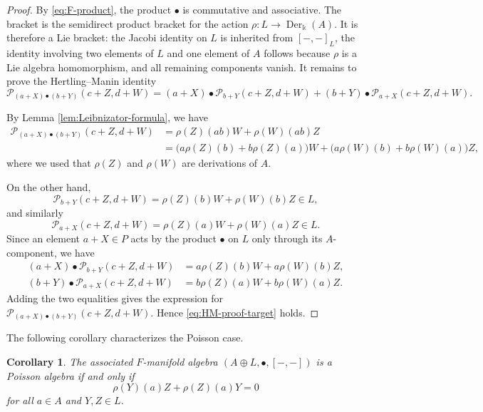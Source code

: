 \documentclass[10pt,a4paper]{amsart}
\newtheorem{corollary}[theorem]{Corollary}
\newcommand{\kk}{\Bbbk}
\newcommand{\Der}{\operatorname{Der}}
\newcommand{\Pcal}{\mathcal P}
\begin{document}
	\begin{proof}
		By \eqref{eq:F-product}, the product $\bullet$ is commutative and associative.
		The bracket is the semidirect product bracket
		for the action $\rho:L\to\Der_\kk(A)$.  It is therefore a Lie bracket: the
		Jacobi identity on $L$ is inherited from $[-,-]_L$, the identity involving two
		elements of $L$ and one element of $A$ follows because $\rho$ is a Lie algebra
		homomorphism, and all remaining components vanish.  It remains to prove the
		Hertling--Manin identity
		\begin{equation}\label{eq:HM-proof-target}
			\Pcal_{(a+X)\bullet (b+Y)}(c+Z,d+W)
			=(a+X)\bullet\Pcal_{b+Y}(c+Z,d+W)+(b+Y)\bullet\Pcal_{a+X}(c+Z,d+W).
		\end{equation}
		
		By Lemma \ref{lem:Leibnizator-formula}, we have
		\begin{align*}
			\Pcal_{(a+X)\bullet (b+Y)}(c+Z,d+W)
			&=\rho(Z)(ab)W+\rho(W)(ab)Z \\
			&=\bigl(a\rho(Z)(b)+b\rho(Z)(a)\bigr)W
			+\bigl(a\rho(W)(b)+b\rho(W)(a)\bigr)Z,
		\end{align*}
		where we used that $\rho(Z)$ and $\rho(W)$ are derivations of $A$.
		
		On the other hand,
		\[
		\Pcal_{b+Y}(c+Z,d+W)=\rho(Z)(b)W+\rho(W)(b)Z\in L,
		\]
		and similarly
		\[
		\Pcal_{a+X}(c+Z,d+W)=\rho(Z)(a)W+\rho(W)(a)Z\in L.
		\]
		Since an element $a+X\in P$ acts by the product $\bullet$ on $L$ only through
		its $A$-component, we have
		\begin{align*}
			(a+X)\bullet\Pcal_{b+Y}(c+Z,d+W)
			&=a\rho(Z)(b)W+a\rho(W)(b)Z,\\
			(b+Y)\bullet\Pcal_{a+X}(c+Z,d+W)
			&=b\rho(Z)(a)W+b\rho(W)(a)Z.
		\end{align*}
		Adding the two equalities gives the expression for
		$\Pcal_{(a+X)\bullet (b+Y)}(c+Z,d+W)$.  Hence \eqref{eq:HM-proof-target} holds.
	\end{proof}
	
	
	
	
	The following corollary characterizes the Poisson case.
	
	\begin{corollary}\label{cor:poisson-specialization}
		The associated $F$-manifold algebra $(A\oplus L,\bullet,[-,-])$ is a
		Poisson algebra if and only if
		\begin{equation}\label{eq:Poisson-condition}
			\rho(Y)(a)Z+\rho(Z)(a)Y=0
		\end{equation}
		for all $a\in A$ and $Y,Z\in L$.
	\end{corollary}
	
\end{document}
